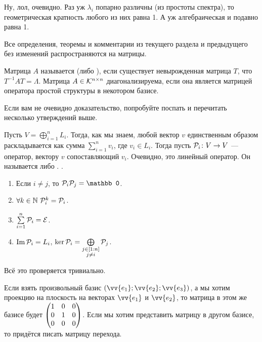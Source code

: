 \documentclass{article}
\let\vec\vv
\DeclareMathOperator{\operIm}{Im}
\let\Im\operIm
\newcommand{\id}{{\mathcal{E}}}
\begin{document}
\begin{itemize}
\begin{Proof}
            Ну, лол, очевидно. Раз уж $\lambda_i$ попарно различны (из простоты спектра), то геометрическая кратность любого из них равна 1. А уж алгебраическая и подавно равна 1.
        \end{Proof}
        \begin{Comment}
            Все определения, теоремы и комментарии из текущего раздела и предыдущего без изменений распространяются на матрицы.
        \end{Comment}
        \dfn Матрица $A$ называется  (либо ), если существует невырожденная матрица $T$, что $T^{-1}AT=\Lambda$.
        \thm Матрица $A\in{\mathcal{K}}^{n\times n}$ диагонализируема, если она является матрицей оператора простой структуры в некотором базисе.
        \begin{Proof}
            Если вам не очевидно доказательство, попробуйте поспать и перечитать несколько утверждений выше.
        \end{Proof}
        \dfn Пусть $V=\bigoplus\limits_{i=1}^n L_i$. Тогда, как мы знаем, любой вектор $v$ единственным образом раскладывается как сумма $\sum\limits_{i=1}^nv_i$, где $v_i\in L_i$. Тогда пусть ${\mathcal{P}}_i\colon V\to V$ --- оператор, вектору $v$ сопоставляющий $v_i$. Очевидно, это линейный оператор. Он называется  либо .
        \thm {}.
        \begin{enumerate}
            \item Если $i\neq j$, то $\scriptP_i\scriptP_j=\mathbb0$.
            \item $\forall k\in\mathbb N~{\mathcal{P}}_i^k={\mathcal{P}}_i$.
            \item $\sum\limits_{i=1}^n\scriptP_i=\id$.
            \item $\Im\scriptP_i=L_i$, $\ker{\mathcal{P}}_i=\bigoplus\limits_{\substack{j\in[1:n]\\j\neq i}}{\mathcal{P}}_j$.
        \end{enumerate}
        \begin{Proof}
            Всё это проверяется тривиально.
        \end{Proof}
        \begin{Example}
            Если взять произвольный базис $(\vec{e_1};\vec{e_2};\vec{e_3})$, а мы хотим проекцию на плоскость на векторах $\vec{e_1}$ и $\vec{e_2}$, то матрица в этом же базисе будет $\left(\begin{matrix}1 & 0 & 0\\0 & 1 & 0\\0 & 0 & 0\end{matrix}\right)$. Если мы хотим представить матрицу в другом базисе, то придётся писать матрицу перехода.

\end{Example}
\end{itemize}
\end{document}
